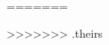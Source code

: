 =======









































































































































>>>>>>> .theirs
\noteattributes{}
